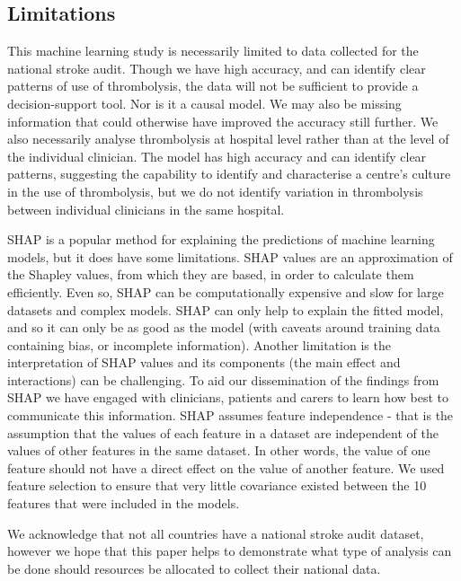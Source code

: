 
\subsection{Limitations}

This machine learning study is necessarily limited to data collected for the national stroke audit. Though we have high accuracy, and can identify clear patterns of use of thrombolysis, the data will not be sufficient to provide a decision-support tool. Nor is it a causal model. We may also be missing information that could otherwise have improved the accuracy still further. We also necessarily analyse thrombolysis at hospital level rather than at the level of the individual clinician. The model has high accuracy and can identify clear patterns, suggesting the capability to identify and characterise a centre's culture in the use of thrombolysis, but we do not identify variation in thrombolysis between individual clinicians in the same hospital.

SHAP is a popular method for explaining the predictions of machine learning models, but it does have some limitations. SHAP values are an approximation of the Shapley values, from which they are based, in order to calculate them efficiently. Even so, SHAP can be computationally expensive and slow for large datasets and complex models. SHAP can only help to explain the fitted model, and so it can only be as good as the model (with caveats around training data containing bias, or incomplete information). Another limitation is the interpretation of SHAP values and its components (the main effect and interactions) can be challenging. To aid our dissemination of the findings from SHAP we have engaged with clinicians, patients and carers to learn how best to communicate this information. SHAP assumes feature independence - that is the assumption that the values of each feature in a dataset are independent of the values of other features in the same dataset. In other words, the value of one feature should not have a direct effect on the value of another feature. We used feature selection to ensure that very little covariance existed between the 10 features that were included in the models. %

We acknowledge that not all countries have a national stroke audit dataset, however we hope that this paper helps to demonstrate what type of analysis can be done should resources be allocated to collect their national data.